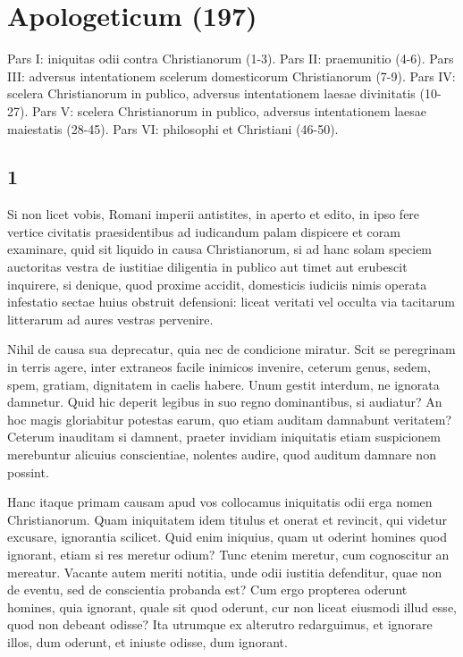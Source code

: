 
\section*{Apologeticum (197)}

Pars I: iniquitas odii contra Christianorum (1-3). Pars II: praemunitio (4-6). Pars III: adversus intentationem scelerum domesticorum Christianorum (7-9). Pars IV: scelera Christianorum in publico, adversus intentationem laesae divinitatis (10-27). Pars V: scelera Christianorum in publico, adversus intentationem laesae maiestatis (28-45). Pars VI: philosophi et Christiani (46-50).

\subsection*{1}

Si non licet vobis, Romani imperii antistites, in aperto et edito, in ipso fere vertice civitatis praesidentibus ad iudicandum palam dispicere et coram examinare, quid sit liquido in causa Christianorum, si ad hanc solam speciem auctoritas vestra de iustitiae diligentia in publico aut timet aut erubescit inquirere, si denique, quod proxime accidit, domesticis iudiciis nimis operata infestatio sectae huius obstruit defensioni: liceat veritati vel occulta via tacitarum litterarum ad aures vestras pervenire.

Nihil de causa sua deprecatur, quia nec de condicione miratur. Scit se peregrinam in terris agere, inter extraneos facile inimicos invenire, ceterum genus, sedem, spem, gratiam, dignitatem in caelis habere. Unum gestit interdum, ne ignorata damnetur. Quid hic deperit legibus in suo regno dominantibus, si audiatur? An hoc magis gloriabitur potestas earum, quo etiam auditam damnabunt veritatem? Ceterum inauditam si damnent, praeter invidiam iniquitatis etiam suspicionem merebuntur alicuius conscientiae, nolentes audire, quod auditum damnare non possint.

Hanc itaque primam causam apud vos collocamus iniquitatis odii erga nomen Christianorum. Quam iniquitatem idem titulus et onerat et revincit, qui videtur excusare, ignorantia scilicet. Quid enim iniquius, quam ut oderint homines quod ignorant, etiam si res meretur odium? Tunc etenim meretur, cum cognoscitur an mereatur.  Vacante autem meriti notitia, unde odii iustitia defenditur, quae non de eventu, sed de conscientia probanda est? Cum ergo propterea oderunt homines, quia ignorant, quale sit quod oderunt, cur non liceat eiusmodi illud esse, quod non debeant odisse? Ita utrumque ex alterutro redarguimus, et ignorare illos, dum oderunt, et iniuste odisse, dum ignorant.

